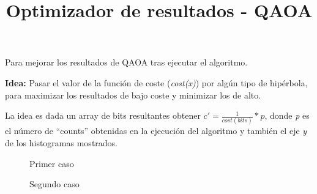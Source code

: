 \documentclass{article}
\title{Optimizador de resultados - QAOA}
\date{}
\begin{document}
\maketitle

Para mejorar los resultados de QAOA tras ejecutar el algoritmo.

\textbf{Idea: } Pasar el valor de la función de coste (\textit{cost(x)}) por algún tipo de hipérbola, para maximizar los resultados de bajo coste y minimizar los de alto.

La idea es dada un array de bits resultantes obtener $c' = \frac{1}{cost(bits)}*p$, donde \textit{p} es el número de ``counts'' obtenidas en la ejecución del algoritmo y también el eje \textit{y} de los histogramas mostrados.

\begin{figure}[htbp]
  \centering
  \caption{Primer caso}
\end{figure}

\begin{figure}[htbp]
  \centering
  \caption{Segundo caso}
\end{figure}
\end{document}
